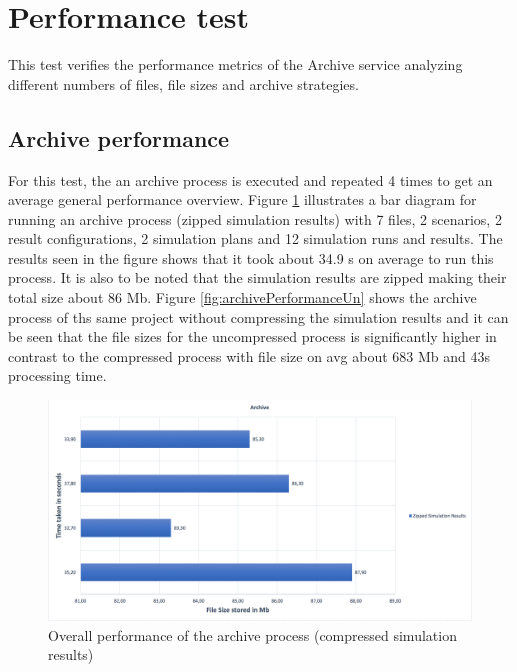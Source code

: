 \section{Performance test}
This test verifies the performance metrics of the Archive service analyzing different numbers of files, file sizes and archive strategies.

\subsection{Archive performance}
For this test, the an archive process is executed and repeated 4 times to get an average general performance overview. Figure \ref{fig:archivePerformance} illustrates a bar diagram for running an archive process (zipped simulation results) with 7 files, 2 scenarios, 2 result configurations, 2 simulation plans
and 12 simulation runs and results. The results seen in the figure shows that it took about 34.9 s on average to run this process. It is also to be noted that the
simulation results are zipped making their total size about 86 Mb. Figure \ref{fig:archivePerformanceUn} shows the archive process of ths same project without 
compressing the simulation results and it can be seen that the file sizes for the uncompressed process is significantly higher in contrast to the compressed
process with file size on avg about 683 Mb and 43s processing time.

\begin{figure}[H]
    \centering \includegraphics[scale=0.45]{grafiken/archiveZip.png}
    \caption{Overall performance of the archive process (compressed simulation results)}
    \label{fig:archivePerformance}
\end{figure}

